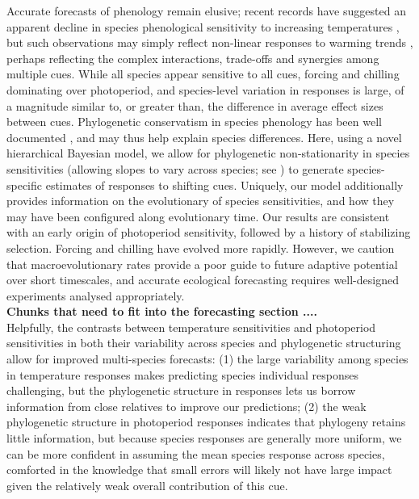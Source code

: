 \documentclass{article}\usepackage[]{graphicx}\usepackage[]{color}
\begin{document}
Accurate forecasts of phenology remain elusive; recent records have suggested an apparent decline in species phenological sensitivity to increasing temperatures \citep{fu2015,piao2017}, but such observations may simply reflect non-linear responses to warming trends \citep{wolkovich2021simple}, perhaps reflecting the complex interactions, trade-offs and synergies among multiple cues. While all species appear sensitive to all cues, forcing and chilling dominating over photoperiod, and species-level variation in responses is large, of a magnitude similar to, or greater than, the difference in average effect sizes between cues. Phylogenetic conservatism in species phenology has been well documented \citep{davies2013phylogenetic,rafferty2017global,joly2019importance}, and may thus help explain species differences. Here, using a novel hierarchical Bayesian model, we allow for phylogenetic non-stationarity in species sensitivities (allowing slopes to vary across species; see \citep{davies2019phylogenetically}) to generate species-specific estimates of responses to shifting cues. Uniquely, our model additionally provides information on the evolutionary of species sensitivities, and how they may have been configured along evolutionary time. Our results are consistent with an early origin of photoperiod sensitivity, followed by a history of stabilizing selection. Forcing and chilling have evolved more rapidly. However, we caution that macroevolutionary rates provide a poor guide to future adaptive potential over short timescales, and accurate ecological forecasting requires well-designed experiments analysed appropriately.\\

{\bf Chunks that need to fit into the forecasting section ....}\\

Helpfully, the contrasts between temperature sensitivities and photoperiod sensitivities in both their variability across species and phylogenetic structuring allow for improved multi-species forecasts: (1) the large variability among species in temperature responses makes predicting species individual responses challenging, but the phylogenetic structure in responses lets us borrow  information from close relatives to improve our predictions; (2) the weak phylogenetic structure in photoperiod responses indicates that phylogeny retains little information, but because species responses are generally more uniform, we can be more confident in assuming the mean species response across species, comforted in the knowledge that small errors will likely not have large impact given the relatively weak overall contribution of this cue.
\end{document}
